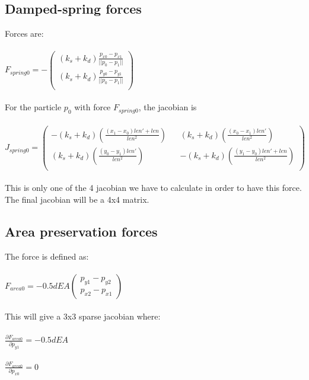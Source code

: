 \documentclass[10pt,a4paper]{report}
\begin{document}
\subsection*{Damped-spring forces}
Forces are:\\\\
$
F_{spring0}=-\begin{pmatrix}
(k_s + k_d) \frac{p_{x0}-p_{x1}}{||p_0-p_1||}\\
(k_s + k_d) \frac{p_{y0}-p_{y1}}{||p_0-p_1||}\\
\end{pmatrix}
$\\\\
For the particle $p_0$ with force $F_{spring0}$, the jacobian is\\\\
$
J_{spring0}=\begin{pmatrix}
-(k_s+k_d)(\frac{(x_1-x_0) len'+len}{len^2}) 	&& (k_s+k_d)(\frac{(x_0-x_1) len'}{len^2})\\
(k_s+k_d)(\frac{(y_0-y_1) len'}{len^2}) 	&& -(k_s+k_d)(\frac{(y_1-y_0) len'+len}{len^2})\\
\end{pmatrix}
$\\\\
This is only one of the 4 jacobian we have to calculate in order to have this force.\\
The final jacobian will be a 4x4 matrix.
\subsection*{Area preservation forces}
The force is defined as:\\\\
$
F_{area0}=-0.5dEA\begin{pmatrix}
p_{y1}-p_{y2}\\
p_{x2}-p_{x1}
\end{pmatrix}
$\\\\
This will give a 3x3 sparse jacobian where:\\\\
$\frac{\partial F_{area0}}{\partial p_{y1}} = -0.5dEA$\\\\
$\frac{\partial F_{area0}}{\partial p_{x0}} = 0$
\end{document}
